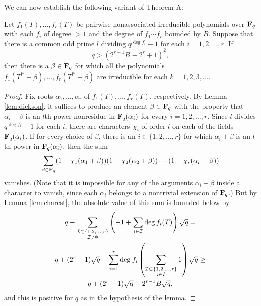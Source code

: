 \documentclass[a4paper]{compositio}
\begin{document}
We can now establish the following variant of Theorem A:

\begin{lem}\label{lem:variant} Let $f_1(T), \dots, f_r(T)$ be pairwise nonassociated
irreducible polynomials over $\mathbf{F}_q$ with each $f_i$ of degree $>1$
and the degree of $f_1\cdots f_r$ bounded by $B$. Suppose that there
is a common odd prime $l$ dividing $q^{\deg{f_i}}-1$ for each
$i=1,2,\dots,r$. If
\[ q > (2^{r-1}B - 2^r + 1)^2, \]
then there is a $\beta \in \mathbf{F}_q$ for which all the polynomials
$f_1(T^{l^k}-\beta), \dots, f_r(T^{l^k}-\beta)$ are irreducible for
each $k=1,2,3, \dots$.
\end{lem}
\begin{proof} Fix roots $\alpha_1, \dots, \alpha_r$ of
$f_1(T), \dots, f_r(T)$, respectively. By Lemma \ref{lem:dickson},
it suffices to produce an element $\beta \in \mathbf{F}_q$ with the property
that $\alpha_i + \beta$ is an $l$th power nonresidue in
$\mathbf{F}_{q}(\alpha_i)$ for every $i=1, 2, \dots, r$. Since $l$ divides
$q^{\deg{f_i}}-1$ for each $i$, there are characters $\chi_i$ of
order $l$ on each of the fields $\mathbf{F}_{q}(\alpha_i)$. If for every
choice of $\beta$, there is an $i \in \{1, 2, \dots, r\}$ for which
$\alpha_i+\beta$ is an $l$th power in $\mathbf{F}_{q}(\alpha_i)$, then the
sum \[ \sum_{\beta \in \mathbf{F}_q}(1-\chi_1(\alpha_1+\beta))
(1-\chi_2(\alpha_2+\beta)) \cdots (1-\chi_r(\alpha_r+\beta)) \]
vanishes. (Note that it is impossible for any of the arguments
$\alpha_i+\beta$ inside a character to vanish, since each $\alpha_i$
belongs to a nontrivial extension of $\mathbf{F}_q$.) But by Lemma
\ref{lem:charest}, the absolute value of this sum is bounded below
by
\begin{multline*}
 q - \sum_{\substack{\mathcal{I} \subset \{1, 2, \dots, r\}\\ \mathcal{I} \neq \emptyset}}\left(-1 + \sum_{i \in
 \mathcal{I}}\deg{f_i(T)}\right)\sqrt{q}= \\ q + (2^{r}-1)\sqrt{q} - \sum_{i=1}^{r}\deg{f_i}
 \left(\sum_{\substack{\mathcal{I} \subset \{1, 2, \dots, r\} \\ i
\in I}}1\right)\sqrt{q} \geq \\ q + (2^r-1)\sqrt{q} - 2^{r-1} B
\sqrt{q},
\end{multline*}
and this is positive for $q$ as in the hypothesis of the lemma.
\end{proof}
\end{document}
